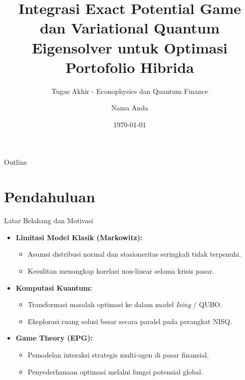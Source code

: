 \documentclass[aspectratio=169]{beamer}
\title[Integrasi EPG  dan   VQE]{Integrasi Exact Potential Game dan  Variational Quantum Eigensolver untuk Optimasi Portofolio Hibrida}
\subtitle{Tugas Akhir - Econophysics  dan   Quantum Finance}
\author[Nama Anda]{Nama Anda} %
\institute[Institusi]{Pembimbing: Nama Pembimbing \\ \medskip Departemen Fisika \\ Universitas ...}
\date{\today}
\begin{document}
\begin{frame}
    \titlepage
\end{frame}

\begin{frame}{Outline}
    \tableofcontents
\end{frame}

\section{Pendahuluan}

\begin{frame}{Latar Belakang  dan   Motivasi}

    \begin{itemize}
        \item \textbf{Limitasi Model Klasik (Markowitz):}
        \begin{itemize}
            \item Asumsi distribusi normal dan  stasioneritas seringkali tidak terpenuhi.
            \item Kesulitan menangkap korelasi non-linear selama krisis pasar.
        \end{itemize}
        \item \textbf{Komputasi Kuantum:}
        \begin{itemize}
            \item Transformasi masalah optimasi ke dalam model \textit{Ising} / QUBO.
            \item Eksplorasi ruang solusi besar secara paralel pada perangkat NISQ.
        \end{itemize}
        \item \textbf{Game Theory (EPG):}
        \begin{itemize}
            \item Pemodelan interaksi strategis multi-agen di pasar finansial.
            \item Penyederhanaan optimasi melalui fungsi potensial global.
        \end{itemize}
    \end{itemize}
\end{frame}
\end{document}
